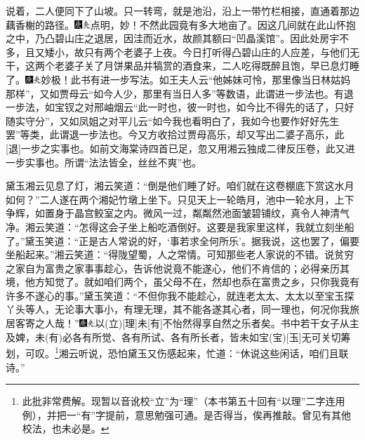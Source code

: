 说着，二人便同下了山坡。只一转弯，就是池沿，沿上一带竹栏相接，直通着那边藕香榭的路径。{\includegraphics[width=3mm]{../Images/00004}\includegraphics[width=3mm]{../Images/00012}\footnotesize \kaishu 点明，妙！不然此园竟有多大地亩了。}因这几间就在此山怀抱之中，乃凸碧山庄之退居，因洼而近水，故颜其额曰“凹晶溪馆”。因此处房宇不多，且又矮小，故只有两个老婆子上夜。今日打听得凸碧山庄的人应差，与他们无干，这两个老婆子关了月饼果品并犒赏的酒食来，二人吃得既醉且饱，早已息灯睡了。{\includegraphics[width=3mm]{../Images/00004}\includegraphics[width=3mm]{../Images/00012}\footnotesize \kaishu 妙极！此书有进一步写法。如王夫人云“他姊妹可怜，那里像当日林姑妈那样”，又如贾母云“如今人少，那里有当日人多”等数语，此谓进一步法也。有退一步法，如宝钗之对邢岫烟云“此一时也，彼一时也，如今比不得先的话了，只好随实守分”，又如凤姐之对平儿云“如今我也看明白了，我如今也要作好好先生罢”等类，此谓退一步法也。今又方收拾过贾母高乐，却又写出二婆子高乐，此{[}退{]}一步之实事也。如前文海棠诗四首已足，忽又用湘云独成二律反压卷，此又进一步实事也。所谓“法法皆全，丝丝不爽”也。}

黛玉湘云见息了灯，湘云笑道：“倒是他们睡了好。咱们就在这卷棚底下赏这水月如何？”二人遂在两个湘妃竹墩上坐下。只见天上一轮皓月，池中一轮水月，上下争辉，如置身于晶宫鲛室之内。微风一过，粼粼然池面皱碧铺纹，真令人神清气净。湘云笑道：“怎得这会子坐上船吃酒倒好。这要是我家里这样，我就立刻坐船了。”黛玉笑道：“正是古人常说的好，‘事若求全何所乐’。据我说，这也罢了，偏要坐船起来。”湘云笑道：“得陇望蜀，人之常情。可知那些老人家说的不错。说贫穷之家自为富贵之家事事趁心，告诉他说竟不能遂心，他们不肯信的；必得亲历其境，他方知觉了。就如咱们两个，虽父母不在，然却也忝在富贵之乡，只你我竟有许多不遂心的事。”黛玉笑道：“不但你我不能趁心，就连老太太、太太以至宝玉探丫头等人，无论事大事小，有理无理，其不能各遂其心者，同一理也，何况你我旅居客寄之人哉！”{\includegraphics[width=3mm]{../Images/00004}\includegraphics[width=3mm]{../Images/00012}\footnotesize \kaishu 以{(立)}{[}理{]}未{[}有{]}不怡然得享自然之乐者矣。书中若干女子从主及婢，未{(有)}必各有所觉、各有所试、各有所长者，皆未如宝{(宝)}{[}玉{]}无可关切筹划，可叹。}\footnote{此批非常费解。现暂以音讹校“立”为“理”（本书第五十回有“以理”二字连用例），并把一“有”字提前，意思勉强可通。是否得当，俟再推敲。曾见有其他校法，也未必是。}湘云听说，恐怕黛玉又伤感起来，忙道：“休说这些闲话，咱们且联诗。”

